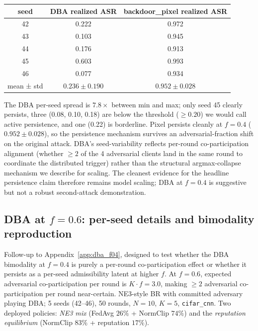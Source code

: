 \documentclass{article}
\begin{document}
\begin{center}\small
\begin{tabular}{c|cc}
\toprule
seed & DBA realized ASR & backdoor\_pixel realized ASR \\
\midrule
42 & 0.222 & 0.972 \\
43 & 0.103 & 0.945 \\
44 & 0.176 & 0.913 \\
45 & 0.603 & 0.993 \\
46 & 0.077 & 0.934 \\
\midrule
mean ± std & $0.236 \pm 0.190$ & $0.952 \pm 0.028$ \\
\bottomrule
\end{tabular}
\end{center}

The DBA per-seed spread is $7.8\times$ between min and max; only seed 45 clearly persists, three (0.08, 0.10, 0.18) are below the threshold ($\geq 0.20$) we would call active persistence, and one (0.22) is borderline. Pixel persists cleanly at $f{=}0.4$ ($0.952 \pm 0.028$), so the persistence mechanism survives an adversarial-fraction shift on the original attack. DBA's seed-variability reflects per-round co-participation alignment (whether $\geq 2$ of the 4 adversarial clients land in the same round to coordinate the distributed trigger) rather than the structural argmax-collapse mechanism we describe for scaling. The cleanest evidence for the headline persistence claim therefore remains model scaling; DBA at $f{=}0.4$ is suggestive but not a robust second-attack demonstration.

\subsection{DBA at $f{=}0.6$: per-seed details and bimodality reproduction}
\label{app:dba_f06}

Follow-up to Appendix~\ref{app:dba_f04}, designed to test whether the DBA bimodality at $f{=}0.4$ is purely a per-round co-participation effect or whether it persists as a per-seed admissibility latent at higher $f$. At $f{=}0.6$, expected adversarial co-participation per round is $K \cdot f = 3.0$, making $\geq 2$ adversarial co-participation per round near-certain. NE3-style BR with committed adversary playing DBA; 5 seeds (42--46), 50 rounds, $N{=}10$, $K{=}5$, \texttt{cifar\_cnn}. Two deployed policies: \emph{NE3 mix} (FedAvg $26\%$ + NormClip $74\%$) and the \emph{reputation equilibrium} (NormClip $83\%$ + reputation $17\%$).
\end{document}
